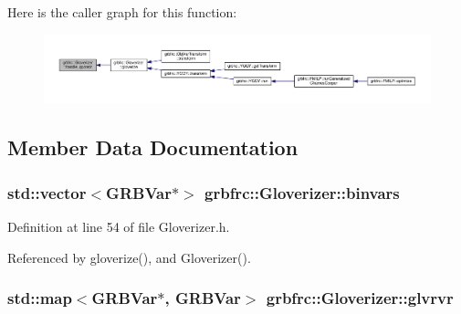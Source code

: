 Here is the caller graph for this function\+:
\nopagebreak
\begin{figure}[H]
\begin{center}
\leavevmode
\includegraphics[width=350pt]{classgrbfrc_1_1Gloverizer_a94a1a62395d6ec2d8ba418a812cfbed7_icgraph}
\end{center}
\end{figure}




\subsection{Member Data Documentation}
\subsubsection[{\texorpdfstring{binvars}{binvars}}]{\setlength{\rightskip}{0pt plus 5cm}std\+::vector$<$G\+R\+B\+Var$\ast$$>$ grbfrc\+::\+Gloverizer\+::binvars\hspace{0.3cm}{\ttfamily [private]}}\hypertarget{classgrbfrc_1_1Gloverizer_a4a6d4fcf4c8a82c009b0fe585555b442}{}\label{classgrbfrc_1_1Gloverizer_a4a6d4fcf4c8a82c009b0fe585555b442}


Definition at line 54 of file Gloverizer.\+h.



Referenced by gloverize(), and Gloverizer().

\subsubsection[{\texorpdfstring{glvrvr}{glvrvr}}]{\setlength{\rightskip}{0pt plus 5cm}std\+::map$<$G\+R\+B\+Var$\ast$, G\+R\+B\+Var$>$ grbfrc\+::\+Gloverizer\+::glvrvr\hspace{0.3cm}{\ttfamily [private]}}\hypertarget{classgrbfrc_1_1Gloverizer_a2a9b1ddefc5a4b685d20fbff92ecfa18}{}\label{classgrbfrc_1_1Gloverizer_a2a9b1ddefc5a4b685d20fbff92ecfa18}


